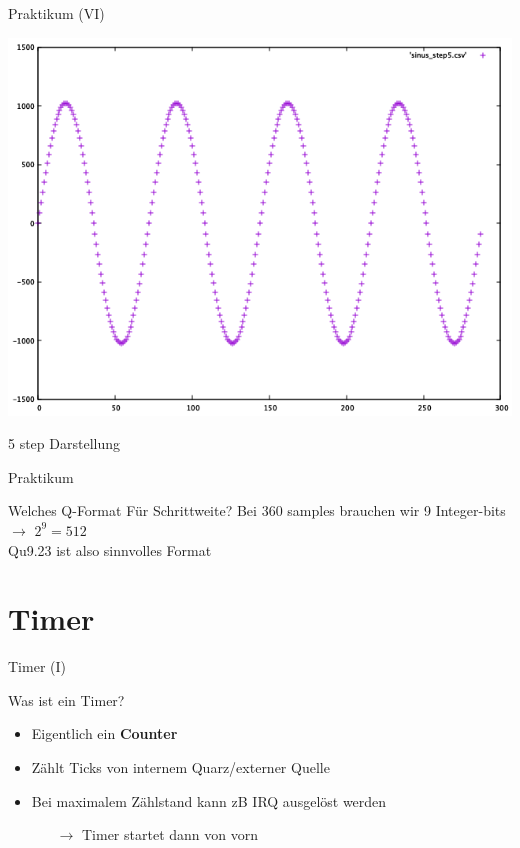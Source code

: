   \begin{frame} {Praktikum (VI)}
    \begin{center}
      \includegraphics [height=.75\textheight]{figs/sinus_step5} 
    \end{center}
    \begin{block} {}
      5 step Darstellung
    \end{block}
  \end{frame}

  \begin{frame} {Praktikum}
    \begin{block} {Welches Q-Format Für Schrittweite?}
      Bei 360 samples brauchen wir 9 Integer-bits $\rightarrow$ $2^9 = 512$ \\
      \vspace{0.5cm}
      Qu9.23 ist also sinnvolles Format
    \end{block}
  \end{frame}


  \section{Timer}
  \begin{frame} {Timer (I)}
    \begin{block} {Was ist ein Timer?}
      \begin{itemize}
        \item Eigentlich ein \textbf{Counter}
        \item Zählt Ticks von internem Quarz/externer Quelle
        \item Bei maximalem Zählstand kann zB IRQ ausgelöst werden 
        \begin{itemize}
          \item[$\rightarrow$] Timer startet dann von vorn
        \end{itemize}
      \end{itemize}
    \end{block}
  \end{frame}

